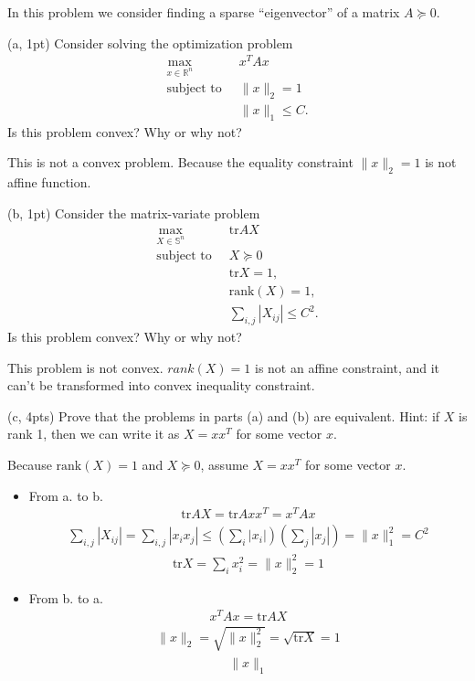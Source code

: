 \documentclass{article}
\theoremstyle{remark}
\theoremstyle{definition}
\newcommand{\st}{\mathop{\mathrm{subject\,\,to}}}
\def\tr{\mathrm{tr}}
\begin{document}
In this problem we consider finding a sparse ``eigenvector'' of a matrix $A
\succeq 0$.

\bigskip
\noindent
(a, 1pt) Consider solving the optimization problem
\[
\begin{split}
\max_{x\in\mathbb{R}^n} \;\; & x^TAx \\
\st \;\; & \|x\|_2 = 1 \\
\;\; & \|x\|_1 \le C.
\end{split}
\]
Is this problem convex? Why or why not?

{
\color{blue}
This is not a convex problem. Because the equality constraint $\|x\|_2=1$ is not affine function.
}

\bigskip
\noindent
(b, 1pt) Consider the matrix-variate problem
\[
\begin{split}
\max_{X \in \mathbb{S}^n} \;\; & \tr AX \\
\st \;\; & X \succeq 0 \\
\;\; & \tr X = 1, \\ 
& \mathrm{rank}(X)=1, \\
& \sum_{i,j} |X_{ij}| \le C^2.
\end{split}
\]
Is this problem convex? Why or why not?

{
\color{blue}
This problem is not convex. $rank(X)=1$ is not an affine constraint, and it can't be transformed into convex inequality constraint.
}

\bigskip
\noindent
(c, 4pts) Prove that the problems in parts (a) and (b) are equivalent.  Hint: if
$X$ is rank 1, then we can write it as $X=xx^T$ for some vector $x$.

{
\color{blue}
Because $\mathrm{rank}(X)=1$ and $X\succeq 0$, assume $X=xx^T$ for some vector $x$.
\begin{itemize}
    \item From a. to b.
    \begin{align*}
        \tr AX = \tr Axx^T = x^TA x
    \end{align*}
    \begin{align*}
        \sum_{i,j} |X_{ij}| = \sum_{i,j} |x_i x_j| \le (\sum_i |x_i|)(\sum_j |x_j|) = \|x\|_1^2= C^2
    \end{align*}
    \begin{align*}
        \tr X=\sum_i x_i^2 = \|x\|_2^2 = 1
    \end{align*}
    
    \item From b. to a.
    \begin{align*}
        x^T A x = \tr AX
    \end{align*}
    \begin{align*}
        \|x\|_2=\sqrt{\|x\|_2^2}=\sqrt{\tr X} = 1
    \end{align*}
    \begin{align*}
        \|x\|_1
    \end{align*}
\end{itemize}
}
\end{document}
